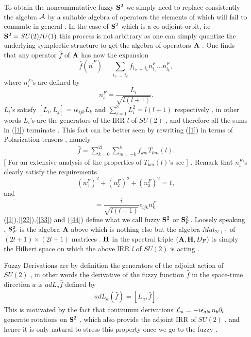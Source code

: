 \documentclass[a4paper,10pt]{article}
\begin{document}
To obtain the noncommutative fuzzy ${\bf S}^2$ we simply need to
replace consistently the algebra ${\cal A}$ by a suitable algebra
of operators the elements of which will fail to  commute in general .
In the case of ${\bf S}^2$ which is a co-adjoint orbit, i.e ${\bf
S}^2=SU(2)/U(1)$ this process is not arbitrary as one can simply
quantize the underlying symplectic structure to get the algebra
of operators ${\bf A}$ . One finds that any operator $\hat{f}$ of
 ${\bf A}$ has now the expansion
\begin{equation}
\hat{f}(\vec{n}^F)=\sum_{i_1,...,i_k}f_{i_1,...,i_k}n_{i_1}^F...n_{i_k}^F,\label{1}
\end{equation}
where $n_{i}^F$'s are defined by
\begin{equation}
n_i^F=\frac{L_i}{\sqrt{l(l+1)}}.\label{22}
\end{equation}
$L_i$'s satisfy $[L_i,L_j]=i{\epsilon}_{ijk}L_k$ and
$\sum_{i=1}^3L_i^2=l(l+1)$ respectively , in other words $L_i$'s
are the generators of the IRR $l$ of $SU(2)$ , and therefore all
the sums in (\ref{1}) terminate \cite{madore,GKP,ydri} . This
fact can be better seen by rewriting (\ref{1}) in terms of
Polarization tensors , namely
\begin{eqnarray}
\hat{f}=\sum_{k=0}^{2l}\sum_{m=-k}^{k}f_{km}T_{km}(l).\label{scalar}
\end{eqnarray}
[ For an extensive analysis of the properties of $T_{km}(l)$'s see
\cite{VKM} ] . Remark that $n_i^F$'s clearly satisfy the
requirements
\begin{equation}
(n_1^{F})^2+(n_2^{F})^2+(n_3^{F})^2=1,\label{33}
\end{equation}
and
\begin{equation}
[n_i^F,n_j^F]=\frac{i}{{\sqrt{l(l+1)}}}{\epsilon}_{ijk}n_k^F.\label{44}
\end{equation}
(\ref{1}),(\ref{22}),(\ref{33}) and (\ref{44}) define what we call
fuzzy ${\bf S}^2$ or ${\bf S}^2_F$. Loosely speaking , ${\bf
S}^2_F$ is the algebra ${\bf A}$ above which is nothing else but
the algebra $Mat_{2l+1}$ of $(2l+1){\times}(2l+1)$ matrices .
${\bf H}$ in the spectral triple $({\bf A},{\bf H},D_F)$ is simply
the Hilbert space on which the above IRR $l$ of $SU(2)$ is acting
.

Fuzzy Derivations are by definition the generators of the adjoint
action of $SU(2)$ , in other words the derivative of the fuzzy
function $\hat{f}$ in the space-time direction $a$ is
$adL_a\hat{f}$ defined by
\begin{eqnarray}
adL_a(\hat{f})=[L_a,\hat{f}].
\end{eqnarray}
This is motivated by the fact that continuum derivations ${\cal
L}_a=-i{\epsilon}_{abc}n_b{\partial}_c$ generate rotations on
${\bf S}^2$ , which also provide the adjoint IRR of $SU(2)$ , and
hence it is only natural to stress this property once we go to
the fuzzy .
\end{document}
